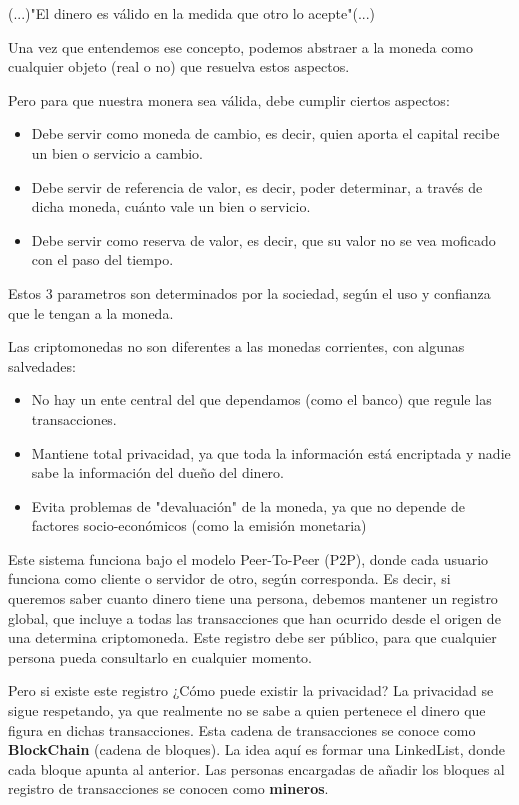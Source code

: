 \documentclass[a4paper,10pt]{article}
\begin{document}
(...)"El dinero es válido en la medida que otro lo acepte"(...)

Una vez que entendemos ese concepto, podemos abstraer a la moneda como cualquier objeto (real o no) que resuelva estos aspectos.

Pero para que nuestra monera sea válida, debe cumplir ciertos aspectos:

\begin{itemize}
 \item Debe servir como moneda de cambio, es decir, quien aporta el capital recibe un bien o servicio a cambio.
 \item Debe servir de referencia de valor, es decir, poder determinar, a través de dicha moneda, cuánto vale un bien o servicio.
 \item Debe servir como reserva de valor, es decir, que su valor no se vea moficado con el paso del tiempo.
\end{itemize}

Estos 3 parametros son determinados por la sociedad, según el uso y confianza que le tengan a la moneda.

Las criptomonedas no son diferentes a las monedas corrientes, con algunas salvedades:

\begin{itemize}
 \item No hay un ente central del que dependamos (como el banco) que regule las transacciones.

 \item Mantiene total privacidad, ya que toda la información está encriptada y nadie sabe la información del dueño del dinero.

 \item Evita problemas de "devaluación" de la moneda, ya que no depende de factores socio-económicos (como la emisión monetaria)
\end{itemize}

Este sistema funciona bajo el modelo Peer-To-Peer (P2P), donde cada usuario funciona como cliente o servidor de otro, según corresponda. Es decir, si queremos saber cuanto dinero tiene una persona, debemos mantener un registro global, que incluye a todas las transacciones que han ocurrido desde el origen de una determina criptomoneda. Este registro debe ser público, para que cualquier persona pueda consultarlo en cualquier momento.

Pero si existe este registro ¿Cómo puede existir la privacidad?
La privacidad se sigue respetando, ya que realmente no se sabe a quien pertenece el dinero que figura en dichas transacciones. Esta cadena de transacciones se conoce como \textbf{BlockChain} (cadena de bloques). La idea aquí es formar una LinkedList, donde cada bloque apunta al anterior.
Las personas encargadas de añadir los bloques al registro de transacciones se conocen como \textbf{mineros}.
\end{document}
